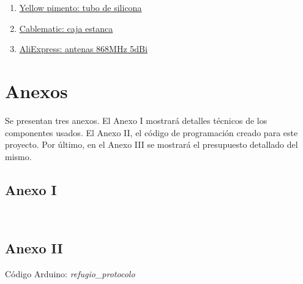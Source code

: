 \documentclass[12pt]{article}
\begin{document}
\begin{enumerate}
				\item 
				\label{bib: yellow pimento}
				\href{https://yellowpimento.com/Para-compresores-de-aire/vdvgx-504009/12mm-OD-ft-m-Tubo-flexible-de-caucho-de-silicona-Tubo-de-manguera-de.htm}{Yellow pimento: tubo de silicona}
				
				
				\item 
				\label{bib: cablematic}
				\href{https://cablematic.com/es/productos/caja-estanca-de-superficie-rectangular-ip55-200-x-155-x-80-mm-AE006/}{Cablematic: caja estanca}
				
				\item 
				\label{bib: AliExpress}
				\href{https://es.aliexpress.com/item/32972870968.html?spm=a2g0s.9042311.0.0.274263c0xMPROA}{AliExpress: antenas 868MHz 5dBi}				
				
			\end{enumerate}

	\pagebreak
	
	\section*{Anexos}
	
	\noindent Se presentan tres anexos. El Anexo I mostrará detalles técnicos de los componentes usados. El Anexo II, el código de programación creado para este proyecto. Por último, en el Anexo III se mostrará el presupuesto detallado del mismo. \\
	
	\pagebreak
	
	\subsection*{Anexo I}
	\label{anexo I: ficha tecnica}
	 \\
	
	\pagebreak
	
	\subsection*{Anexo II}
	\label{anexo II: codigo}
	
	\noindent Código Arduino: \textit{refugio\_protocolo} \\
	
\end{document}
